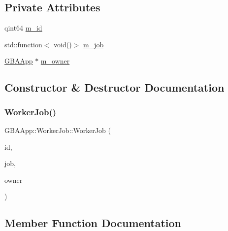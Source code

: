 \subsection*{Private Attributes}
\begin{DoxyCompactItemize}
\item 
qint64 \mbox{\hyperlink{class_q_g_b_a_1_1_g_b_a_app_1_1_worker_job_af5fe09fdc19054f8a079b331d758f001}{m\+\_\+id}}
\item 
std\+::function$<$ void()$>$ \mbox{\hyperlink{class_q_g_b_a_1_1_g_b_a_app_1_1_worker_job_a02d3cd09aac946540566206bf2e906cd}{m\+\_\+job}}
\item 
\mbox{\hyperlink{class_q_g_b_a_1_1_g_b_a_app}{G\+B\+A\+App}} $\ast$ \mbox{\hyperlink{class_q_g_b_a_1_1_g_b_a_app_1_1_worker_job_a578ccb50402c763344db65744e7f08d1}{m\+\_\+owner}}
\end{DoxyCompactItemize}


\subsection{Constructor \& Destructor Documentation}
\mbox{\label{class_q_g_b_a_1_1_g_b_a_app_1_1_worker_job_a6411085775a103b6b52519c3f40921b2}} 
\subsubsection{\texorpdfstring{Worker\+Job()}{WorkerJob()}}
{\footnotesize\ttfamily G\+B\+A\+App\+::\+Worker\+Job\+::\+Worker\+Job (\begin{DoxyParamCaption}\item[{qint64}]{id,  }\item[{std\+::function$<$ void()$>$}]{job,  }\item[{\mbox{\hyperlink{class_q_g_b_a_1_1_g_b_a_app}{G\+B\+A\+App}} $\ast$}]{owner }\end{DoxyParamCaption})}



\subsection{Member Function Documentation}
\mbox{\label{class_q_g_b_a_1_1_g_b_a_app_1_1_worker_job_a894af4623a0e57fa653cf6ebb26b956e}} 
